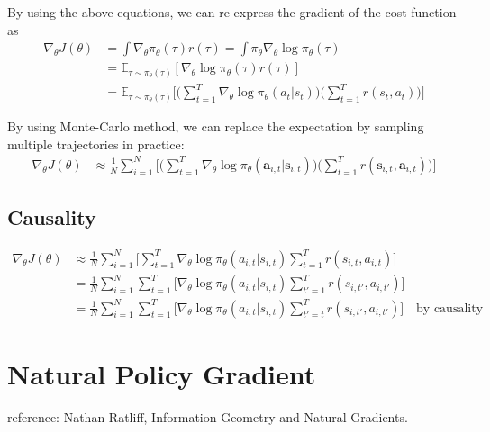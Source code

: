 By using the above equations, we can re-express the gradient of the cost function as
\begin{align*}
	\nabla_\theta J(\theta) &= \int \nabla_\theta \pi_\theta(\tau) r(\tau) = \int \pi_\theta \nabla_\theta \log \pi_\theta(\tau)\\
	&= \mathbb{E}_{\tau\sim \pi_\theta(\tau)}[\nabla_\theta \log \pi_\theta(\tau)r(\tau)] \\
	&= \mathbb{E}_{\tau\sim \pi_\theta(\tau)}\Bigg[\Bigg(\sum_{t=1}^{T}\nabla_\theta\log \pi_\theta(a_t|s_t)\Bigg)\Bigg(\sum_{t=1}^{T}r(s_t,a_t)\Bigg)\Bigg]
\end{align*}

By using Monte-Carlo method, we can replace the expectation by sampling multiple trajectories in practice:
\begin{align*}
	\nabla_\theta J(\theta) &\approx  \frac{1}{N}\sum_{i=1}^{N}\Bigg[\Bigg(\sum_{t=1}^{T}\nabla_\theta\log \pi_\theta(\mathbf{a}_{i,t}|\mathbf{s}_{i,t})\Bigg)\Bigg(\sum_{t=1}^{T}r(\mathbf{s}_{i,t}, \mathbf{a}_{i,t})\Bigg)\Bigg]
\end{align*}

\subsection{Causality}
\begin{align*}
	\nabla_\theta J(\theta) &\approx  \frac{1}{N}\sum_{i=1}^{N}\Bigg[\sum_{t=1}^{T}\nabla_\theta\log \pi_\theta(a_{i,t}|s_{i,t})\sum_{t=1}^{T}r(s_{i,t},a_{i,t})\Bigg]\\
	&= \frac{1}{N}\sum_{i=1}^{N}\sum_{t=1}^{T}\Bigg[\nabla_\theta\log \pi_\theta(a_{i,t}|s_{i,t})\sum_{t'=1}^{T}r(s_{i,t'},a_{i,t'})\Bigg]\\
	&= \frac{1}{N}\sum_{i=1}^{N}\sum_{t=1}^{T}\Bigg[\nabla_\theta\log \pi_\theta(a_{i,t}|s_{i,t})\sum_{t'=t}^{T}r(s_{i,t'},a_{i,t'})\Bigg] \quad \textrm{by causality}
\end{align*}



\section{Natural Policy Gradient}
reference: Nathan Ratliff, Information Geometry and Natural Gradients. 
